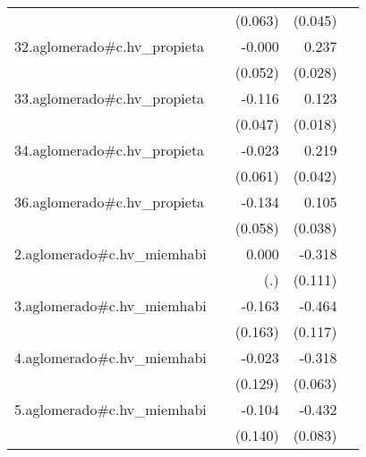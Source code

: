 {\begin{longtable}{l*{4}{D{.}{.}{-1}}}
            &                     &     (0.063)         &     (0.045)         &                     \\
\addlinespace
32.aglomerado#c.hv\_propieta&                     &      -0.000         &       0.237\sym{***}&                     \\
            &                     &     (0.052)         &     (0.028)         &                     \\
\addlinespace
33.aglomerado#c.hv\_propieta&                     &      -0.116\sym{*}  &       0.123\sym{***}&                     \\
            &                     &     (0.047)         &     (0.018)         &                     \\
\addlinespace
34.aglomerado#c.hv\_propieta&                     &      -0.023         &       0.219\sym{***}&                     \\
            &                     &     (0.061)         &     (0.042)         &                     \\
\addlinespace
36.aglomerado#c.hv\_propieta&                     &      -0.134\sym{*}  &       0.105\sym{**} &                     \\
            &                     &     (0.058)         &     (0.038)         &                     \\
\addlinespace
2.aglomerado#c.hv\_miemhabi&                     &       0.000         &      -0.318\sym{**} &                     \\
            &                     &         (.)         &     (0.111)         &                     \\
\addlinespace
3.aglomerado#c.hv\_miemhabi&                     &      -0.163         &      -0.464\sym{***}&                     \\
            &                     &     (0.163)         &     (0.117)         &                     \\
\addlinespace
4.aglomerado#c.hv\_miemhabi&                     &      -0.023         &      -0.318\sym{***}&                     \\
            &                     &     (0.129)         &     (0.063)         &                     \\
\addlinespace
5.aglomerado#c.hv\_miemhabi&                     &      -0.104         &      -0.432\sym{***}&                     \\
            &                     &     (0.140)         &     (0.083)         &                     \\

\end{longtable}}
